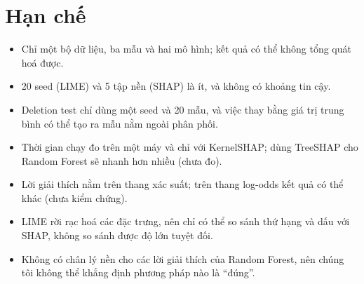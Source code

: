 \documentclass[11pt,a4paper]{article}
\begin{document}
\section{Hạn chế}\label{app:limits}
\begin{itemize}
  \item Chỉ một bộ dữ liệu, ba mẫu và hai mô hình; kết quả có thể không tổng quát hoá được.
  \item 20 seed (LIME) và 5 tập nền (SHAP) là ít, và không có khoảng tin cậy.
  \item Deletion test chỉ dùng một seed và 20 mẫu, và việc thay bằng giá trị trung bình có thể tạo ra mẫu nằm ngoài phân phối.
  \item Thời gian chạy đo trên một máy và chỉ với KernelSHAP; dùng TreeSHAP cho Random Forest sẽ nhanh hơn nhiều (chưa đo).
  \item Lời giải thích nằm trên thang xác suất; trên thang log-odds kết quả có thể khác (chưa kiểm chứng).
  \item LIME rời rạc hoá các đặc trưng, nên chỉ có thể so sánh thứ hạng và dấu với SHAP, không so sánh được độ lớn tuyệt đối.
  \item Không có chân lý nền cho các lời giải thích của Random Forest, nên chúng tôi không thể khẳng định phương pháp nào là ``đúng''.
\end{itemize}
\end{document}
